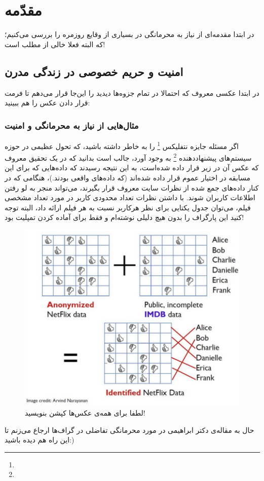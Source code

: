 \chapter{مقدّمه}
 در ابتدا مقدمه‌ای از نیاز به محرمانگی در بسیاری از وقایع روزمره را بررسی می‌کنیم؛ که البته فعلا خالی از مطلب است!
 
\section{
امنیت و حریم خصوصی در زندگی مدرن
}

در ابتدا عکسی معروف که احتمالا در تمام جزوه‌ها دیدید را این‌جا قرار می‌دهم تا فرمت قرار دادن عکس را هم ببینید:
\newpage
\subsection{
مثال‌هایی از نیاز به محرمانگی و امنیت
}
اگر مسئله جایزه نتفلیکس
\footnote{}
 را به خاطر داشته باشید، که تحول عظیمی در حوزه
 سیستم‌های پیشنهاددهنده
\footnote{}
به وجود آورد، جالب است بدانید که در یک تحقیق معروف که عکس آن در زیر قرار داده شده‌است، به این نتیجه رسیدند که داده‌هایی که برای این مسابقه در اختیار عموم قرار داده شده‌اند (که داده‌های واقعی بودند.)، هنگامی که در کنار داده‌های جمع شده از نظرات سایت معروف
قرار بگیرند، می‌تواند منجر به لو رفتن اطلاعات کاربران شوند. با داشتن نظرات تعداد محدودی کاربر در مورد تعداد مشخصی فیلم، می‌توان جدول یکتایی برای نظر هرکاربر نسبت به هر فیلم ارائه داد، البته توجه کنید این پارگراف را بدون هیچ دلیلی نوشته‌ام و فقط برای آماده کردن تمپلیت بود!

\begin{figure}[h]
	\centering
	\includegraphics[width=0.6\linewidth]{Introduction/netflix.png}
	\caption{
	لطفا برای همه‌ی عکس‌ها کپشن بنویسید!
	}
\end{figure}


حال به مقاله‌ی دکتر ابراهیمی در مورد محرمانگی تفاضلی در گراف‌ها \cite{b1} ارجاع می‌زنم تا این راه هم دیده باشید:)